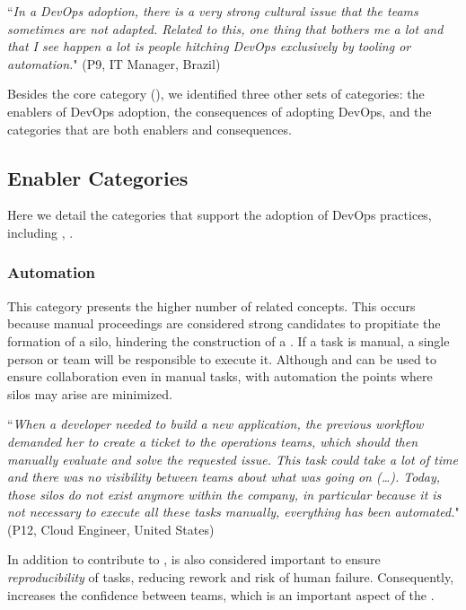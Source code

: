 \begin{mq}``\emph{In a DevOps adoption, there is a very strong cultural issue that the teams
sometimes are not adapted. Related to this, one thing that bothers me a lot and
that I see happen a lot is people hitching DevOps exclusively by tooling or
automation.}" (P9, IT Manager, Brazil)
\end{mq}

Besides the core category (\cc), we identified
three other sets of categories: the enablers
of DevOps adoption, the consequences of adopting
DevOps, and the categories that are both enablers and consequences.

\subsection{Enabler Categories}

Here we detail the categories that support the adoption of
DevOps practices, including , .

\subsubsection{Automation} \label{ssec:automation}

This category presents the higher number of related concepts. This
occurs because manual proceedings are considered strong candidates to
propitiate the formation of a silo, hindering the construction
of a \cc. If a task is manual, a single person or
team will be responsible to execute it. Although  and  can
be used to ensure collaboration even in manual tasks, with automation the
points where silos may arise are minimized.

\begin{mq}
``\emph{When a developer needed to build a new application, the previous workflow demanded her
to create a ticket to the operations teams, which should then manually evaluate and solve
the requested issue. This task could take a lot of time and there was no
visibility between teams about what was going on (\ldots). Today, those silos do not exist
anymore within the company, in particular because it is not necessary to execute all these tasks manually,
everything has been automated.}" (P12, Cloud Engineer, United States)
\end{mq}

In addition to contribute to ,  is also considered
important to ensure \emph{reproducibility} of tasks, reducing rework and risk of
human failure. Consequently,  increases the confidence
between teams, which is an important aspect of the \cc.

